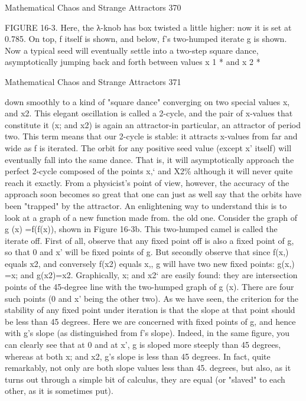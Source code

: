 Mathematical Chaos and Strange Attractors                                              370

FIGURE 16-3. Here, the λ-knob has box twisted a little higher: now it is set at 0.785.
On top, f itself is shown, and below, f’s two-humped iterate g is shown. Now a typical
seed will eventually settle into a two-step square dance, asymptotically jumping back
and forth between values x 1 * and x 2 *




Mathematical Chaos and Strange Attractors                                         371

down smoothly to a kind of "square dance" converging on two special values x, and
x2. This elegant oscillation is called a 2-cycle, and the pair of x-values that constitute
it (x; and x2) is again an attractor-in particular, an attractor of period two. This term
means that our 2-cycle is stable: it attracts x-values from far and wide as f is iterated.
The orbit for any positive seed value (except x' itself) will eventually fall into the
same dance. That is, it will asymptotically approach the perfect 2-cycle composed of
the points x,` and X2\% although it will never quite reach it exactly. From a physicist's
point of view, however, the accuracy of the approach soon becomes so great that one
can just as well say that the orbits have been "trapped" by the attractor.
        An enlightening way to understand this is to look at a graph of a new function
made from. the old one. Consider the graph of g (x) =f(f(x)), shown in Figure 16-3b.
This two-humped camel is called the iterate off. First of all, observe that any fixed
point off is also a fixed point of g, so that 0 and x' will be fixed points of g. But
secondly observe that since f(x,) equals x2, and conversely f(x2) equals x,, g will have
two new fixed points: g(x,) =x; and g(x2)=x2. Graphically, x; and x2` are easily
found: they are intersection points of the 45-degree line with the two-humped graph
of g (x). There are four such points (0 and x' being the other two). As we have seen,
the criterion for the stability of any fixed point under iteration is that the slope at that
point should be less than 45 degrees. Here we are concerned with fixed points of g,
and hence with g's slope (as distinguished from f's slope). Indeed, in the same figure,
you can clearly see that at 0 and at x', g is sloped more steeply than 45 degrees,
whereas at both x; and x2, g's slope is less than 45 degrees. In fact, quite remarkably,
not only are both slope values less than 45. degrees, but also, as it turns out through a
simple bit of calculus, they are equal (or "slaved" to each other, as it is sometimes
put).

